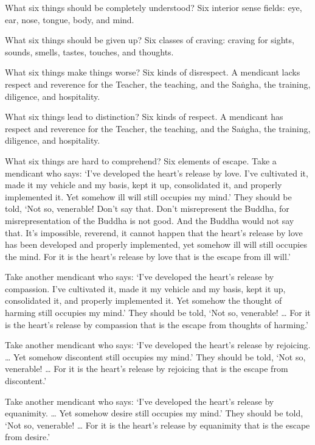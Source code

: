 \documentclass[12pt,openany]{book}%
\begin{document}
What six things should be completely understood? Six interior sense fields: eye, ear, nose, tongue, body, and mind. 

What six things should be given up? Six classes of craving: craving for sights, sounds, smells, tastes, touches, and thoughts. 

What six things make things worse? Six kinds of disrespect. A mendicant lacks respect and reverence for the Teacher, the teaching, and the \textsanskrit{Saṅgha}, the training, diligence, and hospitality. 

What six things lead to distinction? Six kinds of respect. A mendicant has respect and reverence for the Teacher, the teaching, and the \textsanskrit{Saṅgha}, the training, diligence, and hospitality. 

What six things are hard to comprehend? Six elements of escape. Take a mendicant who says: ‘I’ve developed the heart’s release by love. I’ve cultivated it, made it my vehicle and my basis, kept it up, consolidated it, and properly implemented it. Yet somehow ill will still occupies my mind.’ They should be told, ‘Not so, venerable! Don’t say that. Don’t misrepresent the Buddha, for misrepresentation of the Buddha is not good. And the Buddha would not say that. It’s impossible, reverend, it cannot happen that the heart’s release by love has been developed and properly implemented, yet somehow ill will still occupies the mind. For it is the heart’s release by love that is the escape from ill will.’ 

Take another mendicant who says: ‘I’ve developed the heart’s release by compassion. I’ve cultivated it, made it my vehicle and my basis, kept it up, consolidated it, and properly implemented it. Yet somehow the thought of harming still occupies my mind.’ They should be told, ‘Not so, venerable! … For it is the heart’s release by compassion that is the escape from thoughts of harming.’ 

Take another mendicant who says: ‘I’ve developed the heart’s release by rejoicing. … Yet somehow discontent still occupies my mind.’ They should be told, ‘Not so, venerable! … For it is the heart’s release by rejoicing that is the escape from discontent.’ 

Take another mendicant who says: ‘I’ve developed the heart’s release by equanimity. … Yet somehow desire still occupies my mind.’ They should be told, ‘Not so, venerable! … For it is the heart’s release by equanimity that is the escape from desire.’ 
\end{document}
